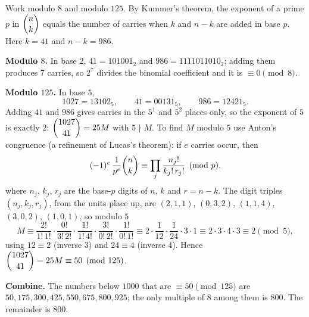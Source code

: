 Work modulo $8$ and modulo $125$. By Kummer's theorem, the exponent of a prime $p$ in $\dbinom{n}{k}$ equals the number of carries when $k$ and $n-k$ are added in base $p$. Here $k=41$ and $n-k=986$.

\textbf{Modulo $8$.} In base $2$, $41=101001_2$ and $986=1111011010_2$; adding them produces $7$ carries, so $2^7$ divides the binomial coefficient and it is $\equiv0\pmod8$.

\textbf{Modulo $125$.} In base $5$,
\[
1027=13102_5,\qquad 41=00131_5,\qquad 986=12421_5 .
\]
Adding $41$ and $986$ gives carries in the $5^1$ and $5^2$ places only, so the exponent of $5$ is exactly $2$: $\dbinom{1027}{41}=25M$ with $5\nmid M$. To find $M$ modulo $5$ use Anton's congruence (a refinement of Lucas's theorem): if $e$ carries occur, then
\[
(-1)^e\,\dfrac{1}{p^e}\dbinom{n}{k}\equiv\prod_j\dfrac{n_j!}{k_j!\,r_j!}\pmod p,
\]
where $n_j$, $k_j$, $r_j$ are the base-$p$ digits of $n$, $k$ and $r=n-k$. The digit triples $(n_j,k_j,r_j)$, from the units place up, are $(2,1,1)$, $(0,3,2)$, $(1,1,4)$, $(3,0,2)$, $(1,0,1)$, so modulo $5$
\[
M\equiv\dfrac{2!}{1!\,1!}\cdot\dfrac{0!}{3!\,2!}\cdot\dfrac{1!}{1!\,4!}\cdot\dfrac{3!}{0!\,2!}\cdot\dfrac{1!}{0!\,1!}\equiv2\cdot\dfrac{1}{12}\cdot\dfrac{1}{24}\cdot3\cdot1\equiv2\cdot3\cdot4\cdot3\equiv2\pmod 5,
\]
using $12\equiv2$ (inverse $3$) and $24\equiv4$ (inverse $4$). Hence $\dbinom{1027}{41}=25M\equiv50\pmod{125}$.

\textbf{Combine.} The numbers below $1000$ that are $\equiv50\pmod{125}$ are $50,175,300,425,550,675,800,925$; the only multiple of $8$ among them is $800$. The remainder is $\boxed{800}$.
